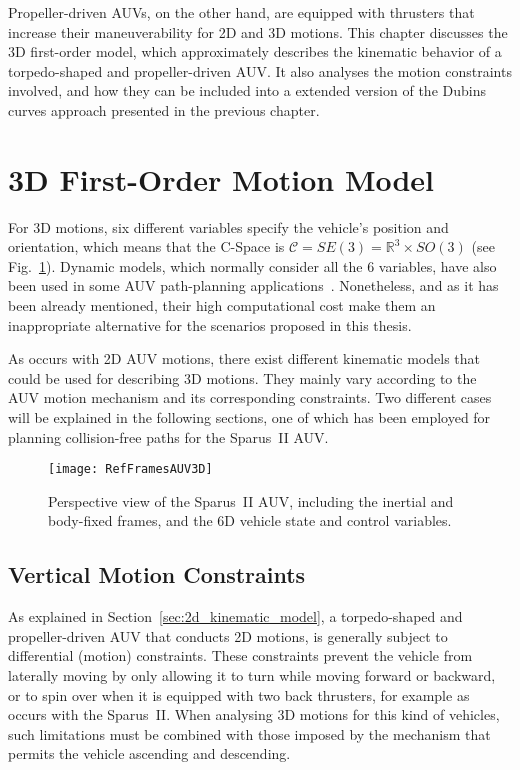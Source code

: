 Propeller-driven \acp{AUV}, on the other hand, are equipped with thrusters that
increase their maneuverability for \ac{2D} and \ac{3D} motions. This chapter
discusses the \ac{3D} first-order model, which approximately describes the
kinematic behavior of a torpedo-shaped and propeller-driven \ac{AUV}. It also
analyses the motion constraints involved, and how they can be included into a
extended version of the Dubins curves approach presented in the previous
chapter.

\section{3D First-Order Motion Model}

For \ac{3D} motions, six different variables specify the vehicle's position
and orientation, which means that the \ac{C-Space} is $\mathcal{C} = SE(3) =
\mathbb{R}^3 \times SO(3)$ (see Fig.~\ref{fig:RefFramesAUV3D}). Dynamic models,
which normally consider all the $6$ variables, have also been used in some
\ac{AUV} path-planning applications~\cite{Ying2000,Wehbe2014}. Nonetheless, and
as it has been already mentioned, their high computational cost make them an
inappropriate alternative for the scenarios proposed in this thesis.

As occurs with \ac{2D} \ac{AUV} motions, there exist different kinematic models
that could be used for describing \ac{3D} motions. They mainly vary according to
the \ac{AUV} motion mechanism and its corresponding constraints. Two different
cases will be explained in the following sections, one of which has been
employed for planning collision-free paths for the Sparus~II \ac{AUV}.

\begin{figure}[htbp]
	\centering
	\texttt{[image: RefFramesAUV3D]} \quad
\caption[Perspective view of the Sparus~II AUV, including the inertial and
body-fixed frames, and the 6D vehicle state and control variables.]
{Perspective view of the Sparus~II AUV, including the inertial and
body-fixed frames, and the 6D vehicle state and control variables.}
\label{fig:RefFramesAUV3D}
\end{figure}

\subsection{Vertical Motion Constraints}

As explained in Section~\ref{sec:2d_kinematic_model}, a torpedo-shaped and
propeller-driven \ac{AUV} that conducts \ac{2D} motions, is generally subject to
differential (motion) constraints. These constraints prevent the vehicle from
laterally moving by only allowing it to turn while moving forward or backward,
or to spin over when it is equipped with two back thrusters, for example as
occurs with the Sparus~II. When analysing \ac{3D} motions for this kind of
vehicles, such limitations must be combined with those imposed by the mechanism
that permits the vehicle ascending and descending.

